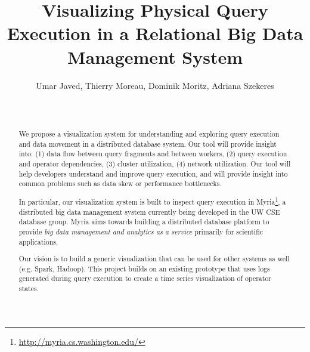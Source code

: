 \documentclass{chi2009}
\begin{document}
\setlength{\paperheight}{11in}
\setlength{\paperwidth}{8.5in}
\setlength{\pdfpageheight}{\paperheight}
\setlength{\pdfpagewidth}{\paperwidth}

\toappear{}

\title{Visualizing Physical Query Execution in a Relational Big Data Management System}
\author{\alignauthor Umar Javed, Thierry Moreau, Dominik Moritz, Adriana Szekeres \\
 \\  \\
}

\maketitle

\begin{abstract}
We propose a visualization system for understanding and exploring query execution and data movement in a distributed database system. Our tool will provide insight into: (1) data flow between query fragments and between workers, (2) query execution and operator dependencies, (3) cluster utilization, (4) network utilization. Our tool will help developers understand and improve query execution, and will provide insight into common problems such as data skew or performance bottlenecks.

In particular, our visualization system is built to inspect query execution in Myria\footnote{\url{http://myria.cs.washington.edu/}}, a distributed big data management system currently being developed in the UW CSE database group. Myria aims towards building a distributed database platform to provide \emph{big data management and analytics as a service} primarily for scientific applications.

Our vision is to build a generic visualization that can be used for other systems as well (e.g. Spark, Hadoop). This project builds on an existing prototype that uses logs generated during query execution to create a time series visualization of operator states.

\end{abstract}
\end{document}
